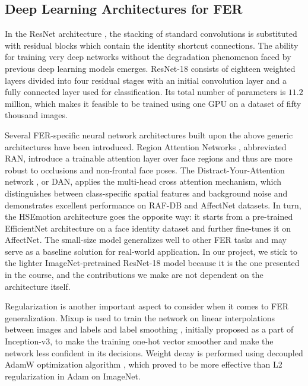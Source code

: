 \documentclass[12pt,a4paper]{article}
\begin{document}
\subsection{Deep Learning Architectures for FER}
\label{sec:litrev:arch}

In the ResNet architecture \autocite{he2016resnet}, the stacking
of standard convolutions is substituted with residual blocks which
contain the identity shortcut connections. The ability for training
very deep networks without the degradation phenomenon faced by
previous deep learning models emerges. ResNet-18 consists of
eighteen weighted layers divided into four residual stages with
an initial convolution layer and a fully connected layer used for
classification. Its total number of parameters is $11.2$
million, which makes it feasible to be trained using one GPU on
a dataset of fifty thousand images.

Several FER-specific neural network architectures built upon the above
generic architectures have been introduced. Region Attention Networks
\autocite{wang2020ran}, abbreviated RAN, introduce a trainable
attention layer over face regions and thus are more robust to occlusions
and non-frontal face poses. The Distract-Your-Attention
network \autocite{wen2023dan}, or DAN, applies the multi-head cross
attention mechanism, which distinguishes between class-specific spatial
features and background noise and demonstrates excellent performance
on RAF-DB and AffectNet datasets. In turn, the HSEmotion architecture
\autocite{savchenko2022hsemotion} goes the opposite way: it starts from
a pre-trained EfficientNet architecture on a face identity dataset and
further fine-tunes it on AffectNet. The small-size model generalizes
well to other FER tasks and may serve as a baseline solution for real-world
application. In our project, we stick to the lighter
ImageNet-pretrained ResNet-18 model because it is the one presented
in the course, and the contributions we make are not dependent on the
architecture itself.

Regularization is another important aspect to consider when it comes to FER generalization.
Mixup \autocite{zhang2018mixup} is used to train the
network on linear interpolations between images and labels and
label smoothing \autocite{szegedy2016rethinking}, initially proposed
as a part of Inception-v3, to make the training one-hot vector smoother
and make the network less confident in its decisions. Weight decay is performed using decoupled AdamW optimization algorithm \autocite{loshchilov2019adamw},
which proved to be more effective than L2 regularization in Adam on ImageNet.
\end{document}
